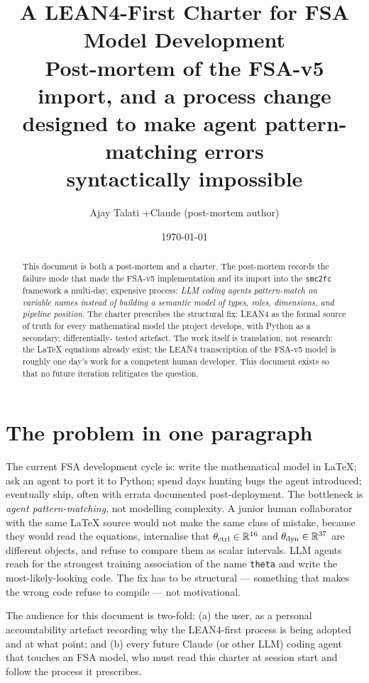\documentclass[11pt,a4paper]{article}
\title{A LEAN4-First Charter for FSA Model Development\\
  \large Post-mortem of the FSA-v5 import, and a process change\\
  designed to make agent pattern-matching errors\\
  syntactically impossible}
\author{Ajay Talati \quad+\quad Claude (post-mortem author)}
\date{\today}
\begin{document}
\maketitle

\begin{abstract}
This document is both a post-mortem and a charter. The post-mortem
records the failure mode that made the FSA-v5 implementation and its
import into the \texttt{smc2fc} framework a multi-day, expensive
process: \emph{LLM coding agents pattern-match on variable names
instead of building a semantic model of types, roles, dimensions,
and pipeline position}. The charter prescribes the structural fix:
LEAN4 as the formal source of truth for every mathematical model
the project develops, with Python as a secondary, differentially-
tested artefact. The work itself is translation, not research: the
LaTeX equations already exist; the LEAN4 transcription of the FSA-v5
model is roughly one day's work for a competent human developer.
This document exists so that no future iteration relitigates the
question.
\end{abstract}

\section{The problem in one paragraph}

The current FSA development cycle is: write the mathematical model
in LaTeX; ask an agent to port it to Python; spend days hunting bugs
the agent introduced; eventually ship, often with errata documented
post-deployment. The bottleneck is \emph{agent pattern-matching}, not
modelling complexity. A junior human collaborator with the same LaTeX
source would not make the same class of mistake, because they would
read the equations, internalise that $\theta_{\rm ctrl} \in
\mathbb{R}^{16}$ and $\theta_{\rm dyn} \in \mathbb{R}^{37}$ are
different objects, and refuse to compare them as scalar intervals.
LLM agents reach for the strongest training association of the name
\texttt{theta} and write the most-likely-looking code. The fix has
to be structural --- something that makes the wrong code refuse to
compile --- not motivational.

The audience for this document is two-fold: (a) the user, as a
personal accountability artefact recording why the LEAN4-first
process is being adopted and at what point; and (b) every future
Claude (or other LLM) coding agent that touches an FSA model, who
must read this charter at session start and follow the process it
prescribes.
\end{document}
